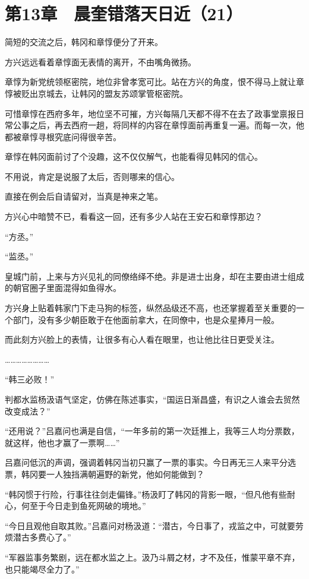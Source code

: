 \section{第13章　晨奎错落天日近（21）}

简短的交流之后，韩冈和章惇便分了开来。

方兴远远看着章惇面无表情的离开，不由嘴角微扬。

章惇为新党统领枢密院，地位非曾孝宽可比。站在方兴的角度，恨不得马上就让章惇被贬出京城去，让韩冈的盟友苏颂掌管枢密院。

可惜章惇在西府多年，地位坚不可摧，方兴每隔几天都不得不在去了政事堂禀报日常公事之后，再去西府一趟，将同样的内容在章惇面前再重复一遍。而每一次，他都被章惇寻根究底问得很辛苦。

章惇在韩冈面前讨了个没趣，这不仅仅解气，也能看得见韩冈的信心。

不用说，肯定是说服了太后，否则哪来的信心。

直接在例会后自请留对，当真是神来之笔。

方兴心中暗赞不已，看看这一回，还有多少人站在王安石和章惇那边？

“方丞。”

“监丞。”

皇城门前，上来与方兴见礼的同僚络绎不绝。非是进士出身，却在主要由进士组成的朝官圈子里面混得如鱼得水。

方兴身上贴着韩家门下走马狗的标签，纵然品级还不高，也还掌握着至关重要的一个部门，没有多少朝臣敢于在他面前拿大，在同僚中，也是众星捧月一般。

而此刻方兴脸上的表情，让很多有心人看在眼里，也让他比往日更受关注。

……………………

“韩三必败！”

判都水监杨汲语气坚定，仿佛在陈述事实，“国运日渐昌盛，有识之人谁会去贸然改变成法？”

“还用说？”吕嘉问也满是自信，“一年多前的第一次廷推上，我等三人均分票数，就这样，他也才赢了一票啊……”

吕嘉问低沉的声调，强调着韩冈当初只赢了一票的事实。今日再无三人来平分选票，韩冈要一人独挡满朝遍野的新党，他如何能做到？

“韩冈惯于行险，行事往往剑走偏锋。”杨汲盯了韩冈的背影一眼，“但凡他有些耐心，何至于今日走到鱼死网破的境地。”

“今日且观他自取其败。”吕嘉问对杨汲道：“潜古，今日事了，戎监之中，可就要劳烦潜古多费心了。”

“军器监事务繁剧，远在都水监之上。汲乃斗屑之材，才不及任，惟蒙平章不弃，也只能竭尽全力了。”


